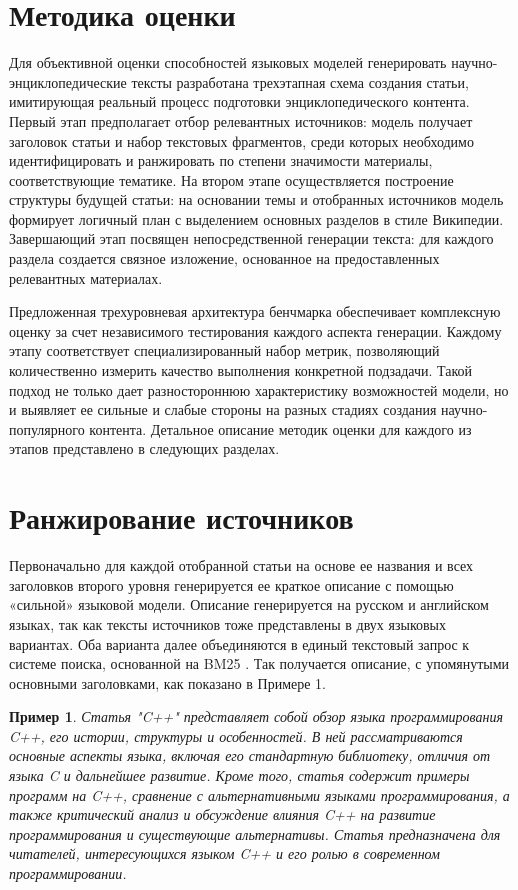 \documentclass{article}
\theoremstyle{definition}
\theoremstyle{plain}
\newtheorem{remark}{Пример}
\begin{document}
\section*{Методика оценки}
Для объективной оценки способностей языковых моделей генерировать научно-энциклопедические тексты разработана трехэтапная схема создания статьи, имитирующая реальный процесс подготовки энциклопедического контента. 
Первый этап предполагает отбор релевантных источников: модель получает заголовок статьи и набор текстовых фрагментов, среди которых необходимо идентифицировать и ранжировать по степени значимости материалы, соответствующие тематике. 
На втором этапе осуществляется построение структуры будущей статьи: на основании темы и отобранных источников модель формирует логичный план с выделением основных разделов в стиле Википедии. 
Завершающий этап посвящен непосредственной генерации текста: для каждого раздела создается связное изложение, основанное на предоставленных релевантных материалах. 

Предложенная трехуровневая архитектура бенчмарка обеспечивает комплексную оценку за счет независимого тестирования каждого аспекта генерации. 
Каждому этапу соответствует специализированный набор метрик, позволяющий количественно измерить качество выполнения конкретной подзадачи. 
Такой подход не только дает разностороннюю характеристику возможностей модели, но и выявляет ее сильные и слабые стороны на разных стадиях создания научно-популярного контента. 
Детальное описание методик оценки для каждого из этапов представлено в следующих разделах.
\section*{Ранжирование источников}
Первоначально для каждой отобранной статьи на основе ее названия и всех заголовков второго уровня генерируется ее краткое описание с помощью «сильной» языковой модели. 
Описание генерируется на русском и английском языках, так как тексты источников тоже представлены в двух языковых вариантах. 
Оба варианта далее объединяются в единый текстовый запрос к системе поиска, основанной на BM25 . Так получается описание, с упомянутыми основными заголовками, как показано в Примере 1.
\begin{remark}
Статья "C++" представляет собой обзор языка программирования C++, его истории, структуры и особенностей. 
В ней рассматриваются основные аспекты языка, включая его стандартную библиотеку, отличия от языка C и дальнейшее развитие. 
Кроме того, статья содержит примеры программ на C++, сравнение с альтернативными языками программирования, а также критический анализ и обсуждение влияния C++ на развитие программирования и существующие альтернативы. 
Статья предназначена для читателей, интересующихся языком C++ и его ролью в современном программировании.
\end{remark}
\end{document}
